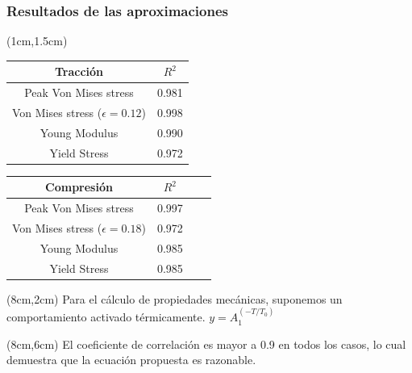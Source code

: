 \begin{frame}
 \frametitle{Resultados de las aproximaciones}
 \begin{textblock*}{6cm}(1cm,1.5cm) 
    
    \begin{table}[htp]
    \begin{center}
    \begin{tabular}{c c}
    \hline
    \textbf{Tracci\'on} & $R^{2}$ \\ \hline \hline
    Peak Von Mises stress &  0.981 \\ \hline
    Von Mises stress ($\epsilon=0.12$) & 0.998 \\ \hline
    Young Modulus & 0.990 \\ \hline
    Yield Stress &  0.972 \\ \hline
    \end{tabular}
    \end{center}
    \end{table}

    \begin{table}[htp]
    \begin{center}
    \begin{tabular}{*{4}{c}}
    \hline
    \textbf{Compresi\'on} & $R^{2}$ \\ \hline \hline
    Peak Von Mises stress & 0.997 \\ \hline
    Von Mises stress ($\epsilon=0.18$) & 0.972 \\ \hline
    Young Modulus & 0.985 \\ \hline
    Yield Stress & 0.985 \\ \hline
    \end{tabular}
    \end{center}
    \end{table}
 \end{textblock*}
  \begin{textblock*}{4.7cm}(8cm,2cm)
  \centering
   Para el c\'alculo de propiedades mec\'anicas, suponemos un comportamiento activado t\'ermicamente.
    $y=A_1^{(-T/T_0)}$
  \end{textblock*}
  \begin{textblock*}{4.7cm}(8cm,6cm)
  \centering
   El coeficiente de correlaci\'on es mayor a 0.9 en todos los casos, lo cual demuestra que la ecuaci\'on propuesta es razonable.
  \end{textblock*}
\end{frame}

